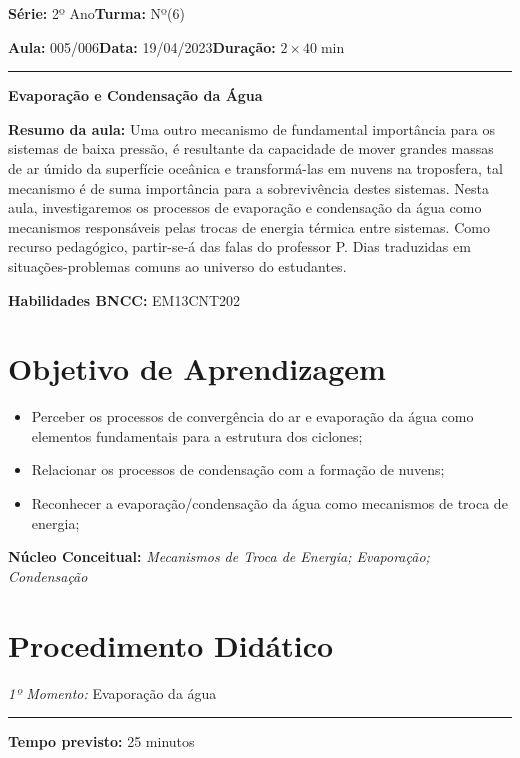 \documentclass[
12pt,				%
openright,			%
oneside,			%
a4paper,			%
chapter=TITLE,		%
english,			%
brazil				%
]{abntex2}
\begin{document}
\par\noindent\textbf{Série:} 2º Ano\hfill{}\textbf{Turma:} Nº(6)
\par\noindent\textbf{Aula:} 005/006\hfill{}\textbf{Data:} 19/04/2023\hfill{}\textbf{Duração:} $2\times 40\min$
\rule{\textwidth}{.5pt}
\bigskip{}  
\noindent
\begin{center}
	\textbf{Evaporação e Condensação da Água}
\end{center}
\par\noindent\textbf{Resumo da aula:} Uma outro mecanismo de fundamental importância para os sistemas de baixa pressão, é resultante da capacidade de mover grandes massas de ar úmido da superfície oceânica e transformá-las em nuvens na troposfera, tal mecanismo é de suma importância para a sobrevivência destes sistemas. Nesta aula, investigaremos os processos de evaporação e condensação da água como mecanismos responsáveis pelas trocas de energia térmica entre sistemas. Como recurso pedagógico, partir-se-á das falas do professor P. Dias traduzidas em situações-problemas  comuns ao universo do estudantes.
\par\noindent\textbf{Habilidades BNCC:} EM13CNT202

\section{Objetivo de Aprendizagem}
\begin{itemize}
	\item Perceber os processos de convergência do ar e evaporação da água como elementos fundamentais para a estrutura dos ciclones;
	\item Relacionar os processos de condensação com a formação de nuvens;
	\item Reconhecer a evaporação/condensação da água como mecanismos de troca de energia;
\end{itemize}

\medskip{}

\noindent\textbf{Núcleo Conceitual:} \emph{Mecanismos de Troca de Energia; Evaporação; Condensação}
\newpage

\section{Procedimento Didático} 
\noindent\emph{1º Momento:} Evaporação da água
\par\noindent\rule{.3\textwidth}{.5pt}  
\par\noindent\textbf{Tempo previsto:} 25 minutos
\end{document}
